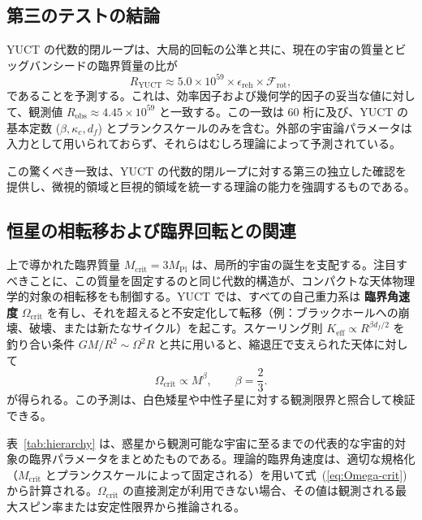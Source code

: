 \documentclass[11pt,a4paper]{article}
\newcommand{\Keff}{K_{\mathrm{eff}}}
\begin{document}
	\subsection{第三のテストの結論}
	
	YUCT の代数的閉ループは、大局的回転の公準と共に、現在の宇宙の質量とビッグバンシードの臨界質量の比が
	\[
	R_{\mathrm{YUCT}} \approx 5.0\times 10^{59} \times \epsilon_{\mathrm{reh}} \times \mathcal{F}_{\mathrm{rot}},
	\]
	であることを予測する。これは、効率因子および幾何学的因子の妥当な値に対して、観測値 \(R_{\mathrm{obs}} \approx 4.45\times 10^{59}\) と一致する。この一致は 60 桁に及び、YUCT の基本定数 (\(\beta, \kappa_c, d_f\)) とプランクスケールのみを含む。外部の宇宙論パラメータは入力として用いられておらず、それらはむしろ理論によって予測されている。
	
	この驚くべき一致は、YUCT の代数的閉ループに対する第三の独立した確認を提供し、微視的領域と巨視的領域を統一する理論の能力を強調するものである。
	
	\subsection{恒星の相転移および臨界回転との関連}
	
	上で導かれた臨界質量 \(M_{\mathrm{crit}} = 3M_{\mathrm{Pl}}\) は、局所的宇宙の誕生を支配する。注目すべきことに、この質量を固定するのと同じ代数的構造が、コンパクトな天体物理学的対象の相転移をも制御する。YUCT では、すべての自己重力系は \textbf{臨界角速度} \(\Omega_{\mathrm{crit}}\) を有し、それを超えると不安定化して転移（例：ブラックホールへの崩壊、破壊、または新たなサイクル）を起こす。スケーリング則 \(\Keff \propto R^{\beta d_f/2}\) を釣り合い条件 \(GM/R^2 \sim \Omega^2 R\) と共に用いると、縮退圧で支えられた天体に対して
	\begin{equation}
		\Omega_{\mathrm{crit}} \propto M^{\beta}, \qquad \beta = \frac{2}{3}.
		\label{eq:Omega-crit}
	\end{equation}
	が得られる。この予測は、白色矮星や中性子星に対する観測限界と照合して検証できる。
	
	表~\ref{tab:hierarchy} は、惑星から観測可能な宇宙に至るまでの代表的な宇宙的対象の臨界パラメータをまとめたものである。理論的臨界角速度は、適切な規格化（\(M_{\mathrm{crit}}\) とプランクスケールによって固定される）を用いて式~(\ref{eq:Omega-crit}) から計算される。\(\Omega_{\mathrm{crit}}\) の直接測定が利用できない場合、その値は観測される最大スピン率または安定性限界から推論される。
	
\end{document}
